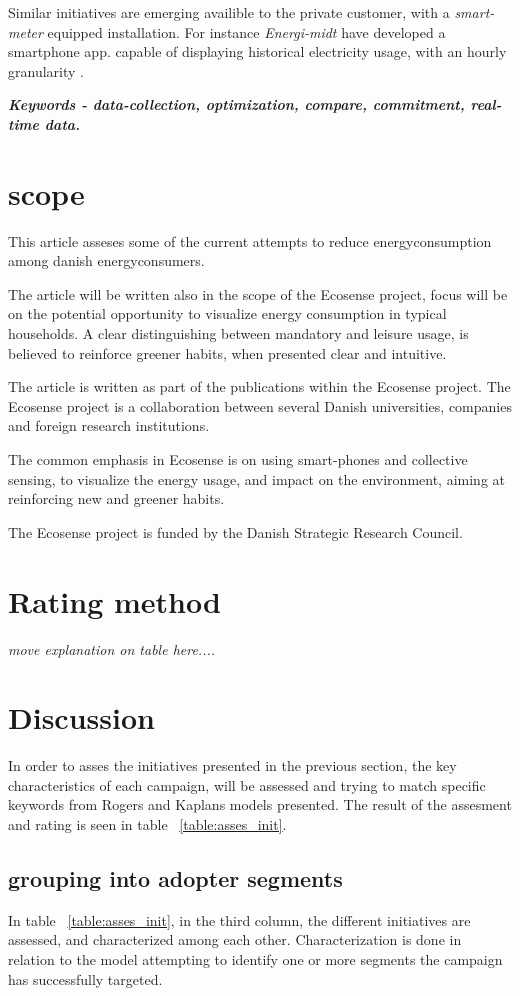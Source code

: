 \documentclass[journal]{IEEEtran}
\begin{document}
Similar initiatives are emerging availible to the private customer, with a \textit{smart-meter} equipped installation. For instance \textit{Energi-midt} have developed a smartphone app. capable of displaying historical electricity usage, with an hourly granularity \cite{em_app}. \newline

\textbf{\textit{Keywords - data-collection, optimization, compare, commitment, real-time data.}}

\section{scope}
This article asseses some of the current attempts to reduce energyconsumption among danish energyconsumers.

The article will be written also in the scope of the Ecosense project, focus will be on the potential opportunity to visualize energy consumption in typical households. A clear distinguishing between mandatory and leisure usage, is believed to reinforce greener habits, when presented clear and intuitive.

The article is written as part of the publications within the Ecosense project. The Ecosense project is a collaboration between several Danish universities, companies and foreign research institutions. 

The common emphasis in Ecosense is on using smart-phones and collective sensing, to visualize the energy usage, and impact on the environment, aiming at reinforcing new and greener habits. 

The Ecosense project is funded by the Danish Strategic Research Council.

\section{Rating method}
\textit{move explanation on table here....}

\section{Discussion}
In order to asses the initiatives presented in the previous section, the key characteristics of each campaign, will be assessed and trying to match specific keywords from Rogers and Kaplans models presented.
The result of the assesment and rating is seen in table ~\ref{table:asses_init}.

\subsection{grouping into adopter segments}
In table ~\ref{table:asses_init}, in the third column, the different initiatives are assessed, and characterized among each other. Characterization is done in relation to the model attempting to identify one or more segments the campaign has successfully targeted. 
\end{document}
